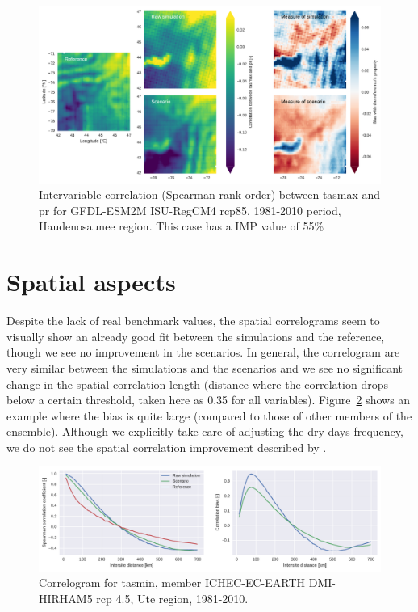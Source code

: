 \documentclass[letterpaper,10pt]{article}
\begin{document}
\begin{figure}
    \centering
    \includegraphics[width=\textwidth]{../images/corr_tasmax_pr_diags.pdf}
    \caption{Intervariable correlation (Spearman rank-order) between tasmax and pr for GFDL-ESM2M ISU-RegCM4 rcp85, 1981-2010 period, Haudenosaunee region. This case has a IMP value of 55\%}\label{fig:icorr}
\end{figure}

\section{Spatial aspects}
Despite the lack of real benchmark values, the spatial correlograms seem to visually show an already good fit between the simulations and the reference, though we see no improvement in the scenarios.
In general, the correlogram are very similar between the simulations and the scenarios and we see no significant change in the spatial correlation length (distance where the correlation drops below a certain threshold, taken here as 0.35 for all variables).
Figure~\ref{fig:scorr} shows an example where the bias is quite large (compared to those of other members of the ensemble).
Although we explicitly take care of adjusting the dry days frequency, we do not see the spatial correlation improvement described by \cite{Francois2020}.

\begin{figure}
\centering
\includegraphics[width=\textwidth]{../images/correlogram_tasmin_diags.pdf}
\caption{Correlogram for tasmin, member ICHEC-EC-EARTH DMI-HIRHAM5 rcp 4.5, Ute region, 1981-2010.}\label{fig:scorr}
\end{figure}
\end{document}
